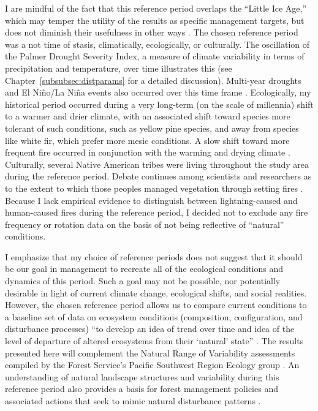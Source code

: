 I are mindful of the fact that this reference period overlaps the ``Little Ice Age,'' which may temper the utility of the results as specific management targets, but does not diminish their usefulness in other ways \citep{Minnich2007,Safford2013}. The chosen reference period was a not time of stasis, climatically, ecologically, or culturally. The oscillation of the Palmer Drought Severity Index, a measure of climate variability in terms of precipitation and temperature, over time illustrates this (see Chapter~\ref{subsubsec:distparams} for a detailed discussion). Multi-year droughts and El Ni\~no/La Ni\~na events also occurred over this time frame \citep{Minnich2007}. Ecologically, my historical period occurred during a very long-term (on the scale of millennia) shift to a warmer and drier climate, with an associated shift toward species more tolerant of such conditions, such as yellow pine species, and away from species like white fir, which prefer more mesic conditions. A slow shift toward more frequent fire occurred in conjunction with the warming and drying climate \citep{Safford2013}. Culturally, several Native American tribes were living throughout the study area during the reference period. Debate continues among scientists and researchers as to the extent to which those peoples managed vegetation through setting fires \citep{Anderson1996}. Because I lack empirical evidence to distinguish between lightning-caused and human-caused fires during the reference period, I decided not to exclude any fire frequency or rotation data on the basis of not being reflective of ``natural'' conditions. 

I emphasize that my choice of reference periods does not suggest that it should be our goal in management to recreate all of the ecological conditions and dynamics of this period. Such a goal may not be possible, nor potentially desirable in light of current climate change, ecological shifts, and social realities. However, the chosen reference period allows us to compare current conditions to a baseline set of data on ecosystem conditions (composition, configuration, and disturbance processes) ``to develop an idea of trend over time and idea of the level of departure of altered ecosystems from their `natural' state'' \citep{Safford2013}. The results presented here will complement the Natural Range of Variability assessments compiled by the Forest Service's Pacific Southwest Region Ecology group \citep[e.g.,][]{Safford2013,Merriam2013,Meyer2013a,Meyer2013,Estes2013,Estes2013a,Gross2013}. An understanding of natural landscape structures and variability during this reference period also provides a basis for forest management policies and associated actions that seek to mimic natural disturbance patterns \citep{Romme2000,Buse2002}. 






